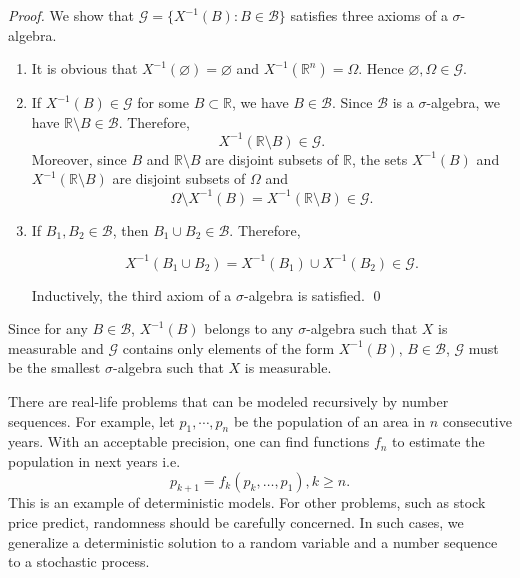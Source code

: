 \textit{Proof.} We show that $\mathcal{G}=\{X^{-1}(B) : B\in \mathcal{B}\}$ satisfies three axioms of a $\sigma$-algebra.

\begin{enumerate}
  \item It is obvious that $X^{-1}(\varnothing)=\varnothing$ and $X^{-1}(\mathbb{R}^n)=\Omega.$ Hence $\varnothing, \Omega\in\mathcal{G}$.
  \item If $X^{-1}(B)\in \mathcal{G}$ for some $B\subset\mathbb{R}$, we have $B\in\mathcal{B}$. Since $\mathcal{B}$ is a $\sigma$-algebra, we have $\mathbb{R}\setminus B\in\mathcal{B}$. Therefore,
        $$X^{-1}(\mathbb{R}\setminus B)\in\mathcal{G}.$$
        Moreover, since $B$ and $\mathbb{R}\setminus B$ are disjoint subsets of $\mathbb{R}$, the sets $X^{-1}(B)$ and $X^{-1}(\mathbb{R}\setminus B)$ are disjoint subsets of $\Omega$ and $$\Omega\setminus X^{-1}(B)=X^{-1}(\mathbb{R}\setminus B)\in\mathcal{G}.$$
  \item If $B_1,B_2\in\mathcal{B}$, then $B_1\cup B_2\in\mathcal{B}$. Therefore,

        $$X^{-1}(B_1\cup B_2) = X^{-1}(B_1)\cup X^{-1}(B_2)\in \mathcal{G}.$$

        Inductively, the third axiom of a $\sigma$-algebra is satisfied. \qed
\end{enumerate}

Since for any $B\in\mathcal{B}$, $X^{-1}(B)$ belongs to any $\sigma$-algebra such that $X$ is measurable and $\mathcal{G}$ contains only elements of the form $X^{-1}(B),\,B\in\mathcal{B}$, $\mathcal{G}$ must be the smallest $\sigma$-algebra such that $X$ is measurable.

There are real-life problems that can be modeled recursively by number sequences. For example, let $p_1,\cdots, p_n$ be the population of an area in $n$ consecutive years. With an acceptable precision, one can find functions $f_n$ to estimate the population in next years i.e.
$$p_{k+1}=f_k(p_{k},\ldots,p_1), k \ge n.$$
This is an example of deterministic models. For other problems, such as stock price predict, randomness should be carefully concerned. In such cases, we generalize a deterministic solution to a random variable and a number sequence to a stochastic process.


